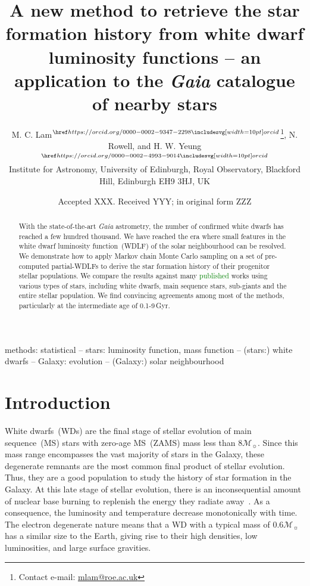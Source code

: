 \documentclass[fleqn,usenatbib]{mnras}
\title[Galactic SFH from \textit{Gaia} GCNS WDLF]{A new method to retrieve the star formation history from white dwarf luminosity functions -- an application to the \textit{Gaia} catalogue of nearby stars}
\author[M. C. Lam et al.]{
M. C. Lam$^{\orcid{0000-0002-9347-2298}}$\thanks{Contact e-mail: \href{mailto:mlam@roe.ac.uk}{mlam@roe.ac.uk}},
N. Rowell,
and H. W. Yeung$^{\orcid{0000-0002-4993-9014}}$
\\
Institute for Astronomy, University of Edinburgh, Royal Observatory, Blackford Hill, Edinburgh EH9 3HJ, UK
}
\date{Accepted XXX. Received YYY; in original form ZZZ}
\newcommand{\msun}{\mathcal{M}_{\sun}}
\begin{document}
\label{firstpage}
\pagerange{\pageref{firstpage}--\pageref{lastpage}}
\maketitle


\begin{abstract}
With the state-of-the-art \textit{Gaia} astrometry, the number of confirmed
white dwarfs has reached a few hundred thousand. We have reached the era where
small features in the white dwarf luminosity function~(WDLF) of the solar
neighbourhood can be resolved. We demonstrate how to apply Markov chain Monte
Carlo sampling on a set of pre-computed partial-WDLFs to derive the star
formation history of their progenitor stellar populations. We compare the
results against many \textcolor{green}{published} works using various types
of stars, including white dwarfs, main sequence stars, sub-giants and 
the entire stellar population. We find convincing
agreements among most of the methods, particularly at the intermediate age
of 0.1-9\,Gyr.

\end{abstract}

\begin{keywords}
methods: statistical -- stars: luminosity function, mass function --
(stars:) white dwarfs -- Galaxy: evolution -- (Galaxy:) solar neighbourhood
\end{keywords}



\section{Introduction}
White dwarfs~(WDs) are the final stage of stellar evolution of main
sequence~(MS) stars with zero-age MS~(ZAMS) mass less than $8\msun$. Since this
mass range encompasses the vast majority of stars in the Galaxy, these
degenerate remnants are the most common final product of stellar evolution.
Thus, they are a good population to study the history of star formation in the
Galaxy. At this late stage of stellar evolution, there is an inconsequential amount of nuclear
base burning to replenish the energy they radiate away~\citep{2010ApJ...717..183R}. As a consequence, the
luminosity and temperature decrease monotonically with time. The electron
degenerate nature means that a WD with a typical mass of $0.6\mathcal{M}_{\sun}$
has a similar size to the Earth, giving rise to their high densities, low
luminosities, and large surface gravities.
\end{document}
